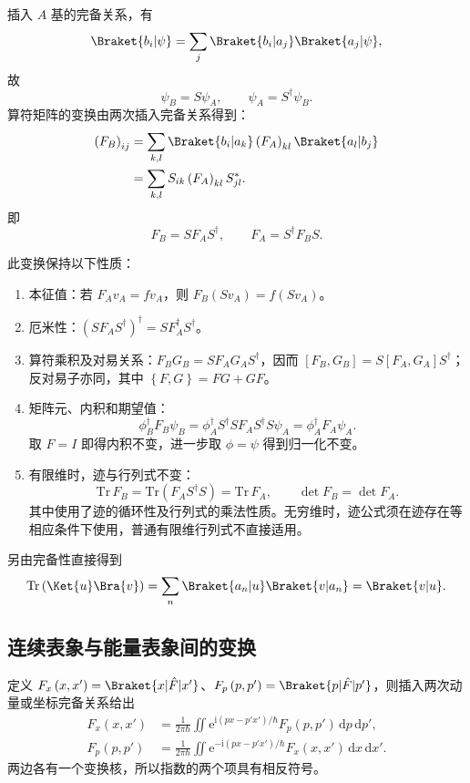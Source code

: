 插入 $A$ 基的完备关系，有
\begin{equation}
\Braket{b_i|\psi}=\sum_j\Braket{b_i|a_j}\Braket{a_j|\psi},
\end{equation}
故
\begin{equation}
\boxed{\psi_B=S\psi_A,\qquad\psi_A=S^\dagger\psi_B.}
\end{equation}
算符矩阵的变换由两次插入完备关系得到：
\begin{align}
\left(F_B\right)_{ij}
&=\sum_{k,l}\Braket{b_i|a_k}\left(F_A\right)_{kl}\Braket{a_l|b_j}\\
&=\sum_{k,l}S_{ik}\left(F_A\right)_{kl}S_{jl}^*.
\end{align}
即
\begin{equation}
\boxed{F_B=SF_AS^\dagger,\qquad F_A=S^\dagger F_BS.}
\label{eq:unitary-change}
\end{equation}

此变换保持以下性质：
\begin{enumerate}
\item 本征值：若 $F_Av_A=fv_A$，则 $F_B\left(Sv_A\right)=f\left(Sv_A\right)$。
\item 厄米性：$\left(SF_AS^\dagger\right)^\dagger=SF_A^\dagger S^\dagger$。
\item 算符乘积及对易关系：$F_BG_B=SF_AG_AS^\dagger$，因而
$\left[F_B,G_B\right]=S\left[F_A,G_A\right]S^\dagger$；反对易子亦同，其中 $\left\{F,G\right\}=FG+GF$。
\item 矩阵元、内积和期望值：
\begin{equation}
\phi_B^\dagger F_B\psi_B
=\phi_A^\dagger S^\dagger SF_AS^\dagger S\psi_A
=\phi_A^\dagger F_A\psi_A.
\end{equation}
取 $F=I$ 即得内积不变，进一步取 $\phi=\psi$ 得到归一化不变。
\item 有限维时，迹与行列式不变：
\begin{equation}
\mathrm{Tr}\,F_B=\mathrm{Tr}\left(F_AS^\dagger S\right)=\mathrm{Tr}\,F_A,
\qquad \det F_B=\det F_A.
\end{equation}
其中使用了迹的循环性及行列式的乘法性质。无穷维时，迹公式须在迹存在等相应条件下使用，普通有限维行列式不直接适用。
\end{enumerate}
另由完备性直接得到
\begin{equation}
\mathrm{Tr}\left(\Ket{u}\Bra{v}\right)
=\sum_n\Braket{a_n|u}\Braket{v|a_n}=\Braket{v|u}.
\end{equation}

\subsection{连续表象与能量表象间的变换}
定义 $F_x\left(x,x'\right)=\Braket{x|\hat F|x'}$、$F_p\left(p,p'\right)=\Braket{p|\hat F|p'}$，则插入两次动量或坐标完备关系给出
\begin{align}
F_x\left(x,x'\right)&=\frac{1}{2\pi\hbar}\iint
\mathrm{e}^{\mathrm{i}\left(px-p'x'\right)/\hbar}F_p\left(p,p'\right)\,\mathrm{d}p\,\mathrm{d}p',\\
F_p\left(p,p'\right)&=\frac{1}{2\pi\hbar}\iint
\mathrm{e}^{-\mathrm{i}\left(px-p'x'\right)/\hbar}F_x\left(x,x'\right)\,\mathrm{d}x\,\mathrm{d}x'.
\end{align}
两边各有一个变换核，所以指数的两个项具有相反符号。


